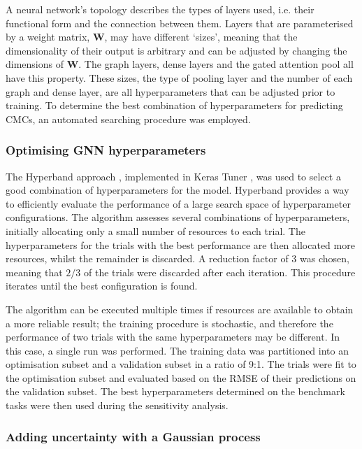 A neural network's topology describes the types of layers used, i.e. their functional form and the connection between them. Layers that are parameterised by a weight matrix, $\mathbf{W}$, may have different `sizes', meaning that the
dimensionality of their output is arbitrary and can be adjusted by changing the dimensions of $\mathbf{W}$. The graph layers, dense layers and the gated attention pool all have this property. These sizes, the type of pooling layer
and the number of each graph and dense layer, are all hyperparameters that can be adjusted prior to training. To determine the best combination of hyperparameters for predicting CMCs, an automated searching procedure was
employed.

\subsubsection{Optimising GNN hyperparameters}

The Hyperband approach \cite{liHyperbandNovelBanditBased2018}, implemented in Keras Tuner \cite{cholletKeras2015}, was used to select a good combination of hyperparameters for the model. Hyperband provides a way to efficiently evaluate
the performance of a large search space of hyperparameter configurations. The algorithm assesses several combinations of hyperparameters, initially allocating only a small number of resources to each trial. The hyperparameters for the
trials with the best performance are then allocated more resources, whilst the remainder is discarded. A reduction factor of 3 was chosen, meaning that $2/3$ of the trials were discarded after each iteration. This procedure iterates until the best configuration is found.

The algorithm can be executed multiple times if resources are available to obtain a more reliable result; the training procedure is stochastic, and therefore the performance of two trials with the same hyperparameters may be different. In this case, a single run was performed. The training data was partitioned into an optimisation subset and a validation subset in a ratio of 9:1. The trials were fit to the optimisation subset and evaluated based on the RMSE of their predictions on the validation subset.
The best hyperparameters determined on the benchmark tasks were then used during the sensitivity analysis.

\subsubsection{Adding uncertainty with a Gaussian process}

